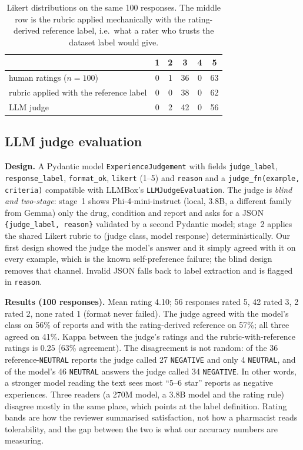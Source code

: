 \documentclass[11pt]{article}
\newcommand{\code}[1]{\texttt{#1}}
\begin{document}
\begin{table}[H]\centering\small
\begin{tabular}{lccccc}\toprule
& 1 & 2 & 3 & 4 & 5 \\\midrule
human ratings ($n=100$) & 0 & 1 & 36 & 0 & 63 \\
rubric applied with the reference label & 0 & 0 & 38 & 0 & 62 \\
LLM judge & 0 & 2 & 42 & 0 & 56 \\\bottomrule
\end{tabular}
\caption{Likert distributions on the same 100 responses. The middle row is the rubric applied mechanically with the rating-derived reference label, i.e.\ what a rater who trusts the dataset label would give.}\label{tab:likert}
\end{table}

\subsection{LLM judge evaluation}\label{sec:judge}
\textbf{Design.} A Pydantic model \code{ExperienceJudgement} with fields \code{judge\_label}, \code{response\_label}, \code{format\_ok}, \code{likert} (1--5) and \code{reason} and a \code{judge\_fn(example, criteria)} compatible with LLMBox's \code{LLMJudgeEvaluation}. The judge is \emph{blind and two-stage}: stage~1 shows Phi-4-mini-instruct (local, 3.8B, a different family from Gemma) only the drug, condition and report and asks for a JSON \code{\{judge\_label, reason\}} validated by a second Pydantic model; stage~2 applies the shared Likert rubric to (judge class, model response) deterministically. Our first design showed the judge the model's answer and it simply agreed with it on every example, which is the known self-preference failure; the blind design removes that channel. Invalid JSON falls back to label extraction and is flagged in \code{reason}.

\textbf{Results (100 responses).} Mean rating 4.10; 56 responses rated 5, 42 rated 3, 2 rated 2, none rated 1 (format never failed). The judge agreed with the model's class on 56\% of reports and with the rating-derived reference on 57\%; all three agreed on 41\%. Kappa between the judge's ratings and the rubric-with-reference ratings is 0.25 (63\% agreement). The disagreement is not random: of the 36 reference-\code{NEUTRAL} reports the judge called 27 \code{NEGATIVE} and only 4 \code{NEUTRAL}, and of the model's 46 \code{NEUTRAL} answers the judge called 34 \code{NEGATIVE}. In other words, a stronger model reading the text sees most ``5--6 star'' reports as negative experiences. Three readers (a 270M model, a 3.8B model and the rating rule) disagree mostly in the same place, which points at the label definition. Rating bands are how the reviewer summarised satisfaction, not how a pharmacist reads tolerability, and the gap between the two is what our accuracy numbers are measuring.
\end{document}
